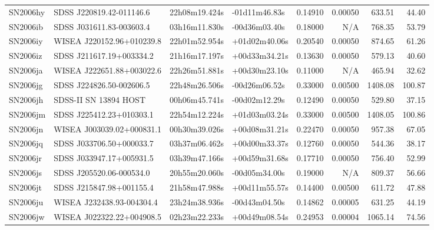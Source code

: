 \begin{longtable}{llllrrrr}
SN2006hy         &        SDSS J220819.42-011146.6 &   22h08m19.424s &   -01d11m46.83s &  0.14910 &  0.00050 &   633.51 &       44.40 \\
SN2006ib         &        SDSS J031611.83-003603.4 &   03h16m11.830s &   -00d36m03.40s &  0.18000 &      N/A &   768.35 &       53.79 \\
SN2006iy         &       WISEA J220152.96+010239.8 &   22h01m52.954s &   +01d02m40.06s &  0.20540 &  0.00050 &   874.65 &       61.26 \\
SN2006iz         &        SDSS J211617.19+003334.2 &   21h16m17.197s &   +00d33m34.21s &  0.13630 &  0.00050 &   579.13 &       40.60 \\
SN2006ja         &       WISEA J222651.88+003022.6 &   22h26m51.881s &   +00d30m23.10s &  0.11000 &      N/A &   465.94 &       32.62 \\
SN2006jg         &        SDSS J224826.50-002606.5 &   22h48m26.506s &   -00d26m06.52s &  0.33000 &  0.00500 &  1408.08 &      100.87 \\
SN2006jh         &           SDSS-II SN 13894 HOST &   00h06m45.741s &   -00d02m12.29s &  0.12490 &  0.00050 &   529.80 &       37.15 \\
SN2006jm         &        SDSS J225412.23+010303.1 &   22h54m12.224s &   +01d03m03.24s &  0.33000 &  0.00500 &  1408.05 &      100.86 \\
SN2006jn         &       WISEA J003039.02+000831.1 &   00h30m39.026s &   +00d08m31.21s &  0.22470 &  0.00050 &   957.38 &       67.05 \\
SN2006jq         &        SDSS J033706.50+000033.7 &   03h37m06.462s &   +00d00m33.37s &  0.12760 &  0.00050 &   544.36 &       38.17 \\
SN2006jr         &        SDSS J033947.17+005931.5 &   03h39m47.166s &   +00d59m31.68s &  0.17710 &  0.00050 &   756.40 &       52.99 \\
SN2006js         &        SDSS J205520.06-000534.0 &   20h55m20.060s &   -00d05m34.00s &  0.19000 &      N/A &   809.37 &       56.66 \\
SN2006jt         &        SDSS J215847.98+001155.4 &   21h58m47.988s &   +00d11m55.57s &  0.14400 &  0.00500 &   611.72 &       47.88 \\
SN2006ju         &       WISEA J232438.93-004304.4 &   23h24m38.936s &   -00d43m04.50s &  0.14862 &  0.00005 &   631.25 &       44.19 \\
SN2006jw         &       WISEA J022322.22+004908.5 &   02h23m22.233s &   +00d49m08.54s &  0.24953 &  0.00004 &  1065.14 &       74.56 \\

\end{longtable}
